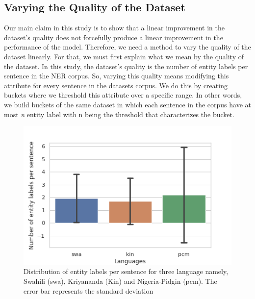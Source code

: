 \documentclass[11pt,a4paper]{article}
\begin{document}

\subsection{Varying the Quality of the Dataset}
\label{sec:exp:var}
Our main claim in this study is to show that a linear improvement in the dataset's quality does not forcefully produce a linear improvement in the performance of the model. Therefore, we need a method to vary the quality of the dataset linearly. For that, we must first explain what we mean by the quality of the dataset. In this study, the dataset's quality is the number of entity labels per sentence in the NER corpus. So, varying this quality means modifying this attribute for every sentence in the datasets corpus. We do this by creating buckets where we threshold this attribute over a specific range. In other words, we build buckets of the same dataset in which each sentence in the corpus have at most \textit{n} entity label with n being the threshold that characterizes the bucket.

\begin{figure}
    \centering
    \includegraphics[width=\columnwidth]{images/dist_plot.png}
    \caption{Distribution of entity labels per sentence for three language namely, Swahili (swa), Kriyananda (Kin) and Nigeria-Pidgin (pcm). The error bar represents the standard deviation}
    \label{fig:dist}
\end{figure}
\end{document}
